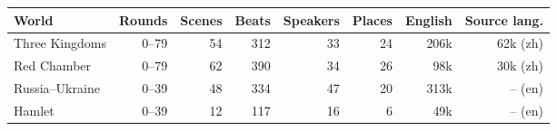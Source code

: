\begin{tabular}{lrrrrrrr}
\toprule
World & Rounds & Scenes & Beats & Speakers & Places & English & Source lang. \\
\midrule
Three Kingdoms & 0--79 & 54 & 312 & 33 & 24 & 206k & 62k (zh) \\
Red Chamber & 0--79 & 62 & 390 & 34 & 26 & 98k & 30k (zh) \\
Russia--Ukraine & 0--39 & 48 & 334 & 47 & 20 & 313k & -- (en) \\
Hamlet & 0--39 & 12 & 117 & 16 & 6 & 49k & -- (en) \\
\bottomrule
\end{tabular}

